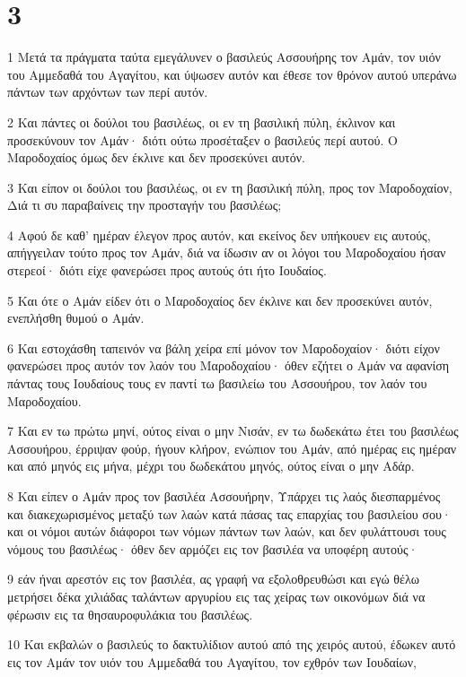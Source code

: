 \chapter{3}

\par 1 Μετά τα πράγματα ταύτα εμεγάλυνεν ο βασιλεύς Ασσουήρης τον Αμάν, τον υιόν του Αμμεδαθά του Αγαγίτου, και ύψωσεν αυτόν και έθεσε τον θρόνον αυτού υπεράνω πάντων των αρχόντων των περί αυτόν.
\par 2 Και πάντες οι δούλοι του βασιλέως, οι εν τη βασιλική πύλη, έκλινον και προσεκύνουν τον Αμάν· διότι ούτω προσέταξεν ο βασιλεύς περί αυτού. Ο Μαροδοχαίος όμως δεν έκλινε και δεν προσεκύνει αυτόν.
\par 3 Και είπον οι δούλοι του βασιλέως, οι εν τη βασιλική πύλη, προς τον Μαροδοχαίον, Διά τι συ παραβαίνεις την προσταγήν του βασιλέως;
\par 4 Αφού δε καθ' ημέραν έλεγον προς αυτόν, και εκείνος δεν υπήκουεν εις αυτούς, απήγγειλαν τούτο προς τον Αμάν, διά να ίδωσιν αν οι λόγοι του Μαροδοχαίου ήσαν στερεοί· διότι είχε φανερώσει προς αυτούς ότι ήτο Ιουδαίος.
\par 5 Και ότε ο Αμάν είδεν ότι ο Μαροδοχαίος δεν έκλινε και δεν προσεκύνει αυτόν, ενεπλήσθη θυμού ο Αμάν.
\par 6 Και εστοχάσθη ταπεινόν να βάλη χείρα επί μόνον τον Μαροδοχαίον· διότι είχον φανερώσει προς αυτόν τον λαόν του Μαροδοχαίου· όθεν εζήτει ο Αμάν να αφανίση πάντας τους Ιουδαίους τους εν παντί τω βασιλείω του Ασσουήρου, τον λαόν του Μαροδοχαίου.
\par 7 Και εν τω πρώτω μηνί, ούτος είναι ο μην Νισάν, εν τω δωδεκάτω έτει του βασιλέως Ασσουήρου, έρριψαν φούρ, ήγουν κλήρον, ενώπιον του Αμάν, από ημέρας εις ημέραν και από μηνός εις μήνα, μέχρι του δωδεκάτου μηνός, ούτος είναι ο μην Αδάρ.
\par 8 Και είπεν ο Αμάν προς τον βασιλέα Ασσουήρην, Υπάρχει τις λαός διεσπαρμένος και διακεχωρισμένος μεταξύ των λαών κατά πάσας τας επαρχίας του βασιλείου σου· και οι νόμοι αυτών διάφοροι των νόμων πάντων των λαών, και δεν φυλάττουσι τους νόμους του βασιλέως· όθεν δεν αρμόζει εις τον βασιλέα να υποφέρη αυτούς·
\par 9 εάν ήναι αρεστόν εις τον βασιλέα, ας γραφή να εξολοθρευθώσι και εγώ θέλω μετρήσει δέκα χιλιάδας ταλάντων αργυρίου εις τας χείρας των οικονόμων διά να φέρωσιν εις τα θησαυροφυλάκια του βασιλέως.
\par 10 Και εκβαλών ο βασιλεύς το δακτυλίδιον αυτού από της χειρός αυτού, έδωκεν αυτό εις τον Αμάν τον υιόν του Αμμεδαθά του Αγαγίτου, τον εχθρόν των Ιουδαίων,
